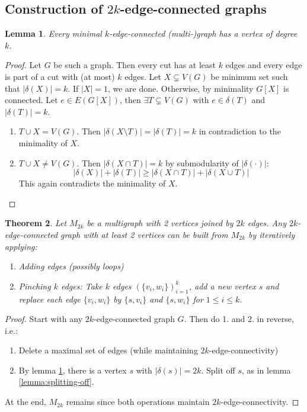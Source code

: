 \documentclass[11pt, a4paper]{article}
\newcommand{\abs}[1]{\left\lvert#1\right\rvert}
\newcommand{\set}[1]{\{#1\}}
\newtheorem{theorem}{Theorem}[section]
\newtheorem{lemma}[theorem]{Lemma}
\theoremstyle{remark}
\theoremstyle{definition}
\begin{document}
\subsection{Construction of \texorpdfstring{$2k$}{2k}-edge-connected graphs}
\begin{lemma}\label{lemma:min-edge-conn-degree}
	Every minimal $k$-edge-connected (multi-)graph has a vertex of degree $k$.
\end{lemma}
\begin{proof}
	Let $G$ be such a graph. Then every cut has at least $k$ edges and every
	edge is part of a cut with (at most) $k$ edges. Let $X\subsetneq V(G)$
	be minimum set such that $\abs{\delta(X)}=k$. If $\abs{X}=1$, we are done.
	Otherwise, by minimality $G[X]$ is connected. Let $e\in E(G[X])$, then
	$\exists T\subsetneq V(G)$ with $e\in\delta(T)$ and $\abs{\delta(T)}=k$.
	\begin{enumerate}
		\item[Case 1:]
		$T\cup X=V(G)$. Then $\abs{\delta(X\setminus T)}=\abs{\delta(T)}=k$
		in contradiction to the minimality of $X$.

		\item[Case 2:]
		$T\cup X\neq V(G)$. Then $\abs{\delta(X\cap T)}=k$ by submodularity of
		$\abs{\delta(\cdot)}$:
		\[\abs{\delta(X)}+\abs{\delta(T)}\geq\abs{\delta(X\cap T)}+\abs{\delta(X\cup T)}\]
		This again contradicts the minimality of $X$.
	\end{enumerate}
\end{proof}

\begin{theorem}\label{thm:2k-edge-conn-structure}
	Let $M_{2k}$ be a multigraph with 2 vertices joined by $2k$ edges. Any
	$2k$-edge-connected graph with at least 2 vertices can be built from
	$M_{2k}$ by iteratively applying:
	\begin{enumerate}
		\item Adding edges (possibly loops)
		\item Pinching $k$ edges: Take $k$ edges $\left(\set{v_i,w_i}\right)_{i=1}^k$,
		add a new vertex $s$ and replace each edge $\set{v_i,w_i}$ by
		$\set{s,v_i}$ and $\set{s,w_i}$ for $1\leq i\leq k$.
	\end{enumerate}
\end{theorem}
\begin{proof}
	Start with any $2k$-edge-connected graph $G$. Then do 1. and 2. in
	reverse, i.e.:
	\begin{enumerate}
		\item Delete a maximal set of edges (while maintaining $2k$-edge-connectivity)
		\item By lemma \ref{lemma:min-edge-conn-degree}, there is a vertex $s$
		with $\abs{\delta(s)}=2k$. Split off $s$, as in lemma \ref{lemma:splitting-off}.
	\end{enumerate}
	At the end, $M_{2k}$ remains since both operations maintain $2k$-edge-connectivity.
\end{proof}
\end{document}
